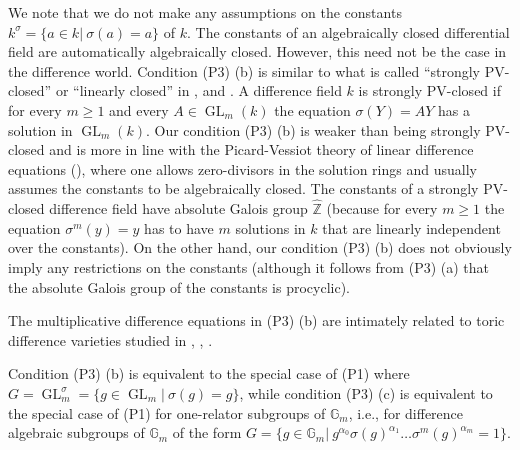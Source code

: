 \documentclass[oneside,reqno]{amsart}
\theoremstyle{definition}
\newcommand{\Gl}{\operatorname{GL}}
\newcommand{\s}{\sigma}
\newcommand{\Gm}{\mathbb{G}_m}
\newcommand{\ZZ}{\mathbb{Z}}
\newcommand{\ptweak}{{\rm{(P3)}}}
\begin{document}
We note that we do not make any assumptions on the constants $k^\s=\{a\in k|\ \s(a)=a\}$ of $k$. The constants of an algebraically closed differential field are automatically algebraically closed. However, this need not be the case in the difference world. Condition \ptweak{} (b) is similar to what is called ``strongly PV-closed'' or ``linearly closed'' in \cite{ChatzidakisPillay:GeneralizedPVExtensionsAndDifferentialGaloisCohomology}, \cite{ChalupnikKowalski:DifferenceSheavesAndTorsors} and \cite{KowalskiPillay:OnAlgebraicSigmaGroups}. A difference field $k$ is strongly PV-closed if for every $m\geq 1$ and every $A\in\Gl_m(k)$ the equation $\s(Y)=AY$ has a solution in $\Gl_m(k)$. Our condition \ptweak{} (b) is weaker than being strongly PV-closed and is more in line with the Picard-Vessiot theory of linear difference equations (\cite{SingerPut:difference}), where one allows zero-divisors in the solution rings and usually assumes the constants to be algebraically closed. The constants of a strongly PV-closed difference field have absolute Galois group $\widehat{\ZZ}$ (because for every $m\geq 1$ the equation $\s^m(y)=y$ has to have $m$ solutions in $k$ that are linearly independent over the constants). On the other hand, our condition \ptweak{} (b) does not obviously imply any restrictions on the constants (although it follows from \ptweak{} (a) that the absolute Galois group of the constants is procyclic).

The multiplicative difference equations in \ptweak{} (b) are intimately related to toric difference varieties studied in \cite{GaoHuangWangYuan:ToricDifferenceVariety}, \cite{GaoHuangYuan:BinomialDifferenceIdeal} \cite{Wang:ToricPdifferenceVariety}, \cite{Wang:FiniteBasisForRadicalWell-mixedDifferenceIdealsGeneratedByBinomials}.

Condition {\rm \ptweak{} (b)} is equivalent to the special case of {\rm (P1)} where $G=\Gl_m^\s=\{g\in\Gl_m|\ \s(g)=g\}$, while condition {\rm \ptweak{} (c)} is equivalent to the special case of {\rm (P1)} for one-relator subgroups of $\Gm$, i.e., for difference algebraic subgroups of $\Gm$ of the form $G=\{g\in\Gm|\ g^{\alpha_0}\s(g)^{\alpha_1}\ldots\s^m(g)^{\alpha_m}=1\}$.
\end{document}
